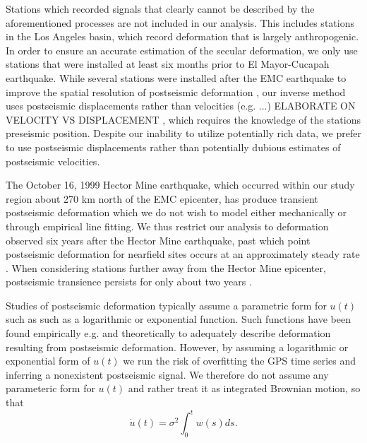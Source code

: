 \documentclass[12pt]{article}
\begin{document}
Stations which recorded signals that clearly cannot be described by the aforementioned processes are not included in our analysis. This includes stations in the Los Angeles basin, which record deformation that is largely anthropogenic. In order to ensure an accurate estimation of the secular deformation, we only use stations that were installed at least six months prior to El Mayor-Cucapah earthquake. While several stations were installed after the EMC earthquake to improve the spatial resolution of postseismic deformation \cite{Spinler2015}, our inverse method uses postseismic displacements rather than velocities (e.g. ...)
ELABORATE ON VELOCITY VS DISPLACEMENT
, which requires the knowledge of the stations preseismic position. Despite our inability to utilize potentially rich data, we prefer to use postseismic displacements rather than potentially dubious estimates of postseismic velocities.

The October 16, 1999 Hector Mine earthquake, which occurred within our study region about 270 km north of the EMC epicenter, has produce transient postseismic deformation which we do not wish to model either mechanically or through empirical line fitting. We thus restrict our analysis to deformation observed six years after the Hector Mine earthquake, past which point postseismic deformation for nearfield sites occurs at an approximately steady rate \cite{Savage2009}. When considering stations further away from the Hector Mine epicenter, postseismic transience persists for only about two years \cite{Spinler2015}.

Studies of postseismic deformation typically assume a parametric form for $u(t)$ such as such as a logarithmic or exponential function. Such functions have been found empirically e.g. \cite{Savage2005a} and theoretically \cite{Marone1991} to adequately describe deformation resulting from postseismic deformation. However, by assuming a logarithmic or exponential form of $u(t)$ we run the risk of overfitting the GPS time series and inferring a nonexistent postseismic signal. We therefore do not assume any parameteric form for $u(t)$ and rather treat it as integrated Brownian motion, so that 
\begin{equation}
    \dot{u}(t) = \sigma^2\int_0^t w(s) ds.
\end{equation}    
\end{document}
